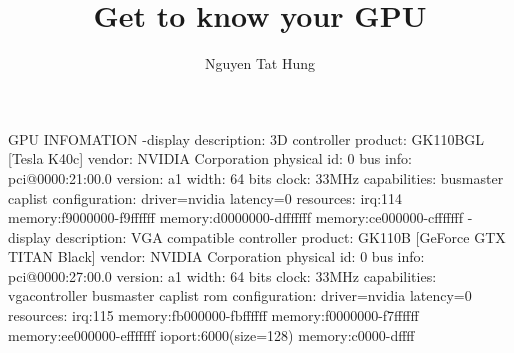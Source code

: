 \documentclass{article}
\title{Get to know your GPU}
\author{Nguyen Tat Hung}
\begin{document}
   \maketitle
   GPU INFOMATION
   -display                 
       description: 3D controller
       product: GK110BGL [Tesla K40c]
       vendor: NVIDIA Corporation
       physical id: 0
       bus info: pci@0000:21:00.0
       version: a1
       width: 64 bits
       clock: 33MHz
       capabilities: busmaster caplist
       configuration: driver=nvidia latency=0
       resources: irq:114 memory:f9000000-f9ffffff memory:d0000000-dfffffff memory:ce000000-cfffffff
  -display
       description: VGA compatible controller
       product: GK110B [GeForce GTX TITAN Black]
       vendor: NVIDIA Corporation
       physical id: 0
       bus info: pci@0000:27:00.0
       version: a1
       width: 64 bits
       clock: 33MHz
       capabilities: vgacontroller busmaster caplist rom
       configuration: driver=nvidia latency=0
       resources: irq:115 memory:fb000000-fbffffff memory:f0000000-f7ffffff memory:ee000000-efffffff ioport:6000(size=128) memory:c0000-dffff
\end{document}

